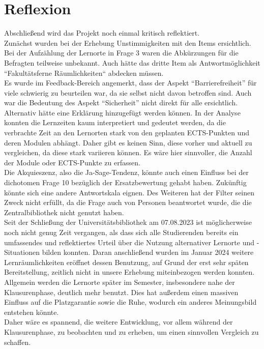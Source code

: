 \documentclass[11pt, a4paper]{article}
\begin{document}
\section{Reflexion}
Abschließend wird das Projekt noch einmal kritisch reflektiert. \\
Zunächst wurden bei der Erhebung Unstimmigkeiten mit den Items ersichtlich.
Bei der Aufzählung der Lernorte in Frage 3 waren die Abkürzungen für die Befragten teilweise unbekannt. Auch hätte das dritte Item als Antwortmöglichkeit “Fakultätsferne Räumlichkeiten“ abdecken müssen. \\
Es wurde im Feedback-Bereich angemerkt, dass der Aspekt “Barrierefreiheit” für viele schwierig zu beurteilen war, da sie selbst nicht davon betroffen sind. Auch war die Bedeutung des Aspekt “Sicherheit” nicht direkt für alle ersichtlich. Alternativ hätte eine Erklärung hinzugefügt werden können.
In der Analyse konnten die Lernzeiten kaum interpretiert und gedeutet werden, da die verbrachte Zeit an den Lernorten stark von den geplanten ECTS-Punkten und deren Modulen abhängt. Daher gibt es keinen Sinn, diese vorher und aktuell zu vergleichen, da diese stark variieren können. Es wäre hier sinnvoller, die Anzahl der Module oder ECTS-Punkte zu erfassen.\\
Die Akquieszenz, also die Ja-Sage-Tendenz, könnte auch einen Einfluss bei der dichotomen Frage 10 bezüglich der Ersatzbewertung gehabt haben. Zukünftig könnte sich eine andere Antwortskala eignen. Des Weiteren hat der Filter seinen Zweck nicht erfüllt, da die Frage auch von Personen beantwortet wurde, die die Zentralbibliothek nicht genutzt haben.\\
Seit der Schließung der Universitätsbibliothek am 07.08.2023 ist möglicherweise noch nicht genug Zeit vergangen, als dass sich alle Studierenden bereits ein umfassendes und reflektiertes Urteil über die Nutzung alternativer Lernorte und -Situationen bilden konnten. 
Daran anschließend wurden im Januar 2024 weitere Lernräumlichkeiten eröffnet dessen Benutzung, auf Grund der erst sehr späten Bereitstellung, zeitlich nicht in unsere Erhebung miteinbezogen werden konnten. \\
Allgemein werden die Lernorte später im Semester, insbesondere nahe der Klausurenphase, deutlich mehr benutzt. Dies hat außerdem einen massiven Einfluss auf die Platzgarantie sowie die Ruhe, wodurch ein anderes Meinungsbild entstehen könnte.\\
Daher wäre es spannend, die weitere Entwicklung, vor allem während der Klausurenphase, zu beobachten und zu erheben, um einen sinnvollen Vergleich zu schaffen.\\
\end{document}
